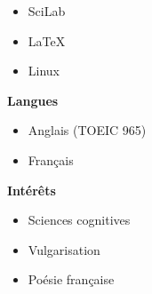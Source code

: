 \documentclass[12pt]{article}
\newlength\cvRightWidth
\begin{document}
\begin{minipage}[t]{\textwidth}
\begin{minipage}[t]{\cvRightWidth}
\begin{multicols}{2}
\begin{itemize}
                    \item SciLab
                    \item\LaTeX
                    \item Linux
                \end{itemize}
            \end{multicols}
            \textbf{Langues}
            \begin{multicols}{2}
                \begin{itemize}
                    \item Anglais {\footnotesize(TOEIC 965)}
                    \item Français
                \end{itemize}
            \end{multicols}
            \textbf{Intérêts}
            \begin{multicols}{2}
                \begin{itemize}
                    \item Sciences cognitives
                    \item Vulgarisation
                    \item Poésie française
                \end{itemize}
            \end{multicols}
        \end{minipage}
    \end{minipage}
\end{document}
